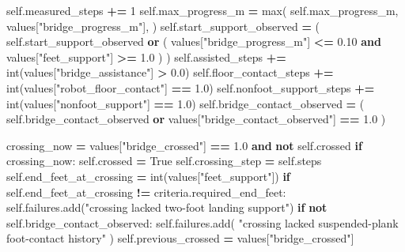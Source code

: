 \documentclass[
  american,
  11pt,
  letterpaper,
]{article}
\newenvironment{Shaded}{\begin{snugshade}}{\end{snugshade}}
\newcommand{\BuiltInTok}[1]{#1}
\newcommand{\ControlFlowTok}[1]{\textcolor[rgb]{0.13,0.29,0.53}{\textbf{#1}}}
\newcommand{\DecValTok}[1]{\textcolor[rgb]{0.00,0.00,0.81}{#1}}
\newcommand{\FloatTok}[1]{\textcolor[rgb]{0.00,0.00,0.81}{#1}}
\newcommand{\KeywordTok}[1]{\textcolor[rgb]{0.13,0.29,0.53}{\textbf{#1}}}
\newcommand{\NormalTok}[1]{#1}
\newcommand{\OperatorTok}[1]{\textcolor[rgb]{0.81,0.36,0.00}{\textbf{#1}}}
\newcommand{\StringTok}[1]{\textcolor[rgb]{0.31,0.60,0.02}{#1}}
\newcommand{\VariableTok}[1]{\textcolor[rgb]{0.00,0.00,0.00}{#1}}
\renewenvironment{Shaded}{\par\smallskip}{\par\smallskip}
\begin{document}
\begin{Shaded}
\begin{Highlighting}[]
        \VariableTok{self}\NormalTok{.measured\_steps }\OperatorTok{+=} \DecValTok{1}
        \VariableTok{self}\NormalTok{.max\_progress\_m }\OperatorTok{=} \BuiltInTok{max}\NormalTok{(}
            \VariableTok{self}\NormalTok{.max\_progress\_m,}
\NormalTok{            values[}\StringTok{"bridge\_progress\_m"}\NormalTok{],}
\NormalTok{        )}
        \VariableTok{self}\NormalTok{.start\_support\_observed }\OperatorTok{=}\NormalTok{ (}
            \VariableTok{self}\NormalTok{.start\_support\_observed}
            \KeywordTok{or}\NormalTok{ (}
\NormalTok{                values[}\StringTok{"bridge\_progress\_m"}\NormalTok{] }\OperatorTok{\textless{}=} \FloatTok{0.10}
                \KeywordTok{and}\NormalTok{ values[}\StringTok{"feet\_support"}\NormalTok{] }\OperatorTok{\textgreater{}=} \FloatTok{1.0}
\NormalTok{            )}
\NormalTok{        )}
        \VariableTok{self}\NormalTok{.assisted\_steps }\OperatorTok{+=} \BuiltInTok{int}\NormalTok{(values[}\StringTok{"bridge\_assistance"}\NormalTok{] }\OperatorTok{\textgreater{}} \FloatTok{0.0}\NormalTok{)}
        \VariableTok{self}\NormalTok{.floor\_contact\_steps }\OperatorTok{+=} \BuiltInTok{int}\NormalTok{(values[}\StringTok{"robot\_floor\_contact"}\NormalTok{] }\OperatorTok{==} \FloatTok{1.0}\NormalTok{)}
        \VariableTok{self}\NormalTok{.nonfoot\_support\_steps }\OperatorTok{+=} \BuiltInTok{int}\NormalTok{(values[}\StringTok{"nonfoot\_support"}\NormalTok{] }\OperatorTok{==} \FloatTok{1.0}\NormalTok{)}
        \VariableTok{self}\NormalTok{.bridge\_contact\_observed }\OperatorTok{=}\NormalTok{ (}
            \VariableTok{self}\NormalTok{.bridge\_contact\_observed}
            \KeywordTok{or}\NormalTok{ values[}\StringTok{"bridge\_contact\_observed"}\NormalTok{] }\OperatorTok{==} \FloatTok{1.0}
\NormalTok{        )}

\NormalTok{        crossing\_now }\OperatorTok{=}\NormalTok{ values[}\StringTok{"bridge\_crossed"}\NormalTok{] }\OperatorTok{==} \FloatTok{1.0} \KeywordTok{and} \KeywordTok{not} \VariableTok{self}\NormalTok{.crossed}
        \ControlFlowTok{if}\NormalTok{ crossing\_now:}
            \VariableTok{self}\NormalTok{.crossed }\OperatorTok{=} \VariableTok{True}
            \VariableTok{self}\NormalTok{.crossing\_step }\OperatorTok{=} \VariableTok{self}\NormalTok{.steps}
            \VariableTok{self}\NormalTok{.end\_feet\_at\_crossing }\OperatorTok{=} \BuiltInTok{int}\NormalTok{(values[}\StringTok{"feet\_support"}\NormalTok{])}
            \ControlFlowTok{if} \VariableTok{self}\NormalTok{.end\_feet\_at\_crossing }\OperatorTok{!=}\NormalTok{ criteria.required\_end\_feet:}
                \VariableTok{self}\NormalTok{.failures.add(}\StringTok{"crossing lacked two{-}foot landing support"}\NormalTok{)}
            \ControlFlowTok{if} \KeywordTok{not} \VariableTok{self}\NormalTok{.bridge\_contact\_observed:}
                \VariableTok{self}\NormalTok{.failures.add(}
                    \StringTok{"crossing lacked suspended{-}plank foot{-}contact history"}
\NormalTok{                )}
        \VariableTok{self}\NormalTok{.previous\_crossed }\OperatorTok{=}\NormalTok{ values[}\StringTok{"bridge\_crossed"}\NormalTok{]}


\end{Highlighting}
\end{Shaded}
\end{document}
